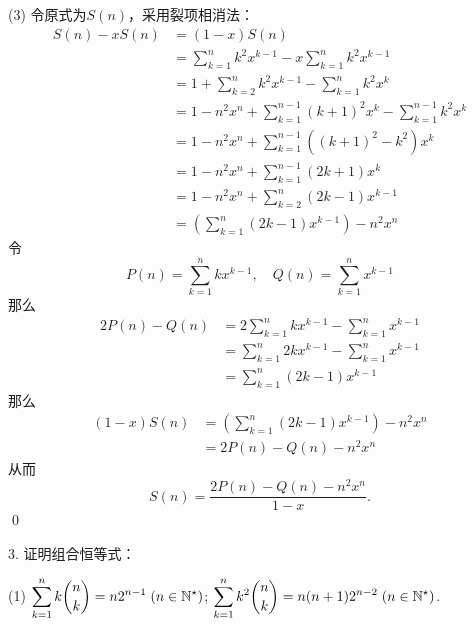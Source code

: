 (3) \solve 令原式为$S(n)$，采用裂项相消法：
\begin{align}
    S(n) - xS(n) &= (1-x)S(n) \\
    &= \sum_{k=1}^n k^2 x^{k-1} - x \sum_{k=1}^{n} k^2 x^{k-1} \\
    &= 1 + \sum_{k=2}^{n} k^2 x^{k-1} - \sum_{k=1}^{n} k^2 x^k \\
    &= 1 - n^2 x^n + \sum_{k=1}^{n-1} (k+1)^2 x^k - \sum_{k=1}^{n-1} k^2 x^k \\
    &= 1 - n^2 x^n + \sum_{k=1}^{n-1} \left((k+1)^2 - k^2 \right) x^k \\
    &= 1 - n^2 x^n + \sum_{k=1}^{n-1} \left(2k + 1 \right) x^k \\
    &= 1 - n^2 x^n + \sum_{k=2}^{n} \left(2k - 1 \right) x^{k-1} \\
    &= \left(\sum_{k=1}^{n} \left(2k - 1 \right) x^{k-1} \right) - n^2 x^n 
\end{align}
令
\begin{equation}
    P(n) = \sum_{k=1}^n k x^{k-1}, \quad Q(n) = \sum_{k=1}^n x^{k-1}
\end{equation}
那么
\begin{align}
    2P(n)-Q(n) &= 2 \sum_{k=1}^n k x^{k-1} - \sum_{k=1}^n x^{k-1} \\
    &= \sum_{k=1}^n 2k x^{k-1} - \sum_{k=1}^n x^{k-1} \\
    &= \sum_{k=1}^n (2k-1) x^{k-1}
\end{align}
那么
\begin{align}
    (1-x)S(n) &= \left(\sum_{k=1}^{n} \left(2k - 1 \right) x^{k-1} \right) - n^2 x^n \\
    &= 2P(n) - Q(n) - n^2 x^n
\end{align}
从而
\begin{equation}
    S(n) = \frac{2P(n)-Q(n)-n^2 x^n}{1-x}.
\end{equation}
\qed\bigskip

3. 证明组合恒等式：
\begin{tasks}(1)
    \task $\displaystyle\sum_{k=1}^n k \binom{n}{k} = n 2^{n-1} \; (n \in \mathbb{N}^\star)$;
    \task $\displaystyle\sum_{k=1}^n k^2 \binom{n}{k} = n(n+1)2^{n-2} \; (n \in \mathbb{N}^\star)$.
\end{tasks}

